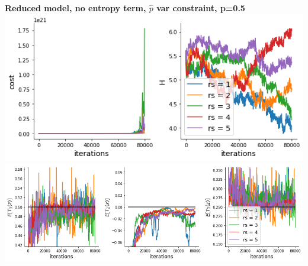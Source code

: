 \documentclass[11pt]{article}
\begin{document}
\begin{center}
\textbf{Reduced model, no entropy term, $\hat{p}$ var constraint, p=0.5} \\
\includegraphics[scale=0.6]{figs/cost_H_SC_pvar_reduced_c=0_p=50.png} \\
\includegraphics[scale=0.6]{figs/constraints_SC_pvar_reduced_c=0_p=50.png}
\end{center}
\end{document}
